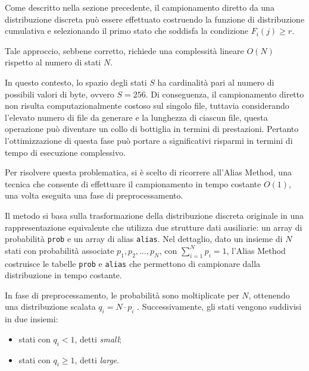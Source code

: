\documentclass{report}
\begin{document}
Come descritto nella sezione precedente, il campionamento diretto da una distribuzione discreta
può essere effettuato costruendo la funzione di distribuzione cumulativa e selezionando il primo
stato che soddisfa la condizione \(F_i(j) \geq r\).

Tale approccio, sebbene corretto, richiede una complessità lineare \(O(N)\) rispetto al numero di stati \(N\).

\bigskip

In questo contesto, lo spazio degli stati \(S\) ha cardinalità pari al numero di possibili valori di byte,
ovvero \(S = 256\). Di conseguenza, il campionamento diretto non risulta computazionalmente costoso sul singolo file,
tuttavia considerando l'elevato numero di file da generare e la lunghezza di ciascun file,
questa operazione può diventare un collo di bottiglia in termini di prestazioni.
Pertanto l'ottimizzazione di questa fase può portare a significativi risparmi in termini di tempo di esecuzione complessivo.

\bigskip

Per risolvere questa problematica, si è scelto di ricorrere all’Alias Method, una
tecnica che consente di effettuare il campionamento in tempo costante \(O(1)\),
una volta eseguita una fase di preprocessamento.

\bigskip

Il metodo si basa sulla trasformazione della distribuzione discreta originale in
una rappresentazione equivalente che utilizza due strutture dati ausiliarie: un
array di probabilità \texttt{prob} e un array di alias \texttt{alias}.
Nel dettaglio, dato un insieme di \(N\) stati con probabilità associate \(p_1, p_2, \dots, p_N\),
con \(\sum_{i=1}^{N} p_i = 1\), l’Alias Method costruisce le tabelle \texttt{prob} e \texttt{alias}
che permettono di campionare dalla distribuzione in tempo costante.

\bigskip

In fase di preprocessamento, le probabilità sono moltiplicate per \(N\), ottenendo
una distribuzione scalata \(q_i = N \cdot p_i\) \cite{darago_alias_2021}.
Successivamente, gli stati vengono suddivisi in due insiemi:
\begin{itemize}
  \item stati con \(q_i < 1\), detti \textit{small};
  \item stati con \(q_i \ge 1\), detti \textit{large}.
\end{itemize}

\bigskip
\end{document}
